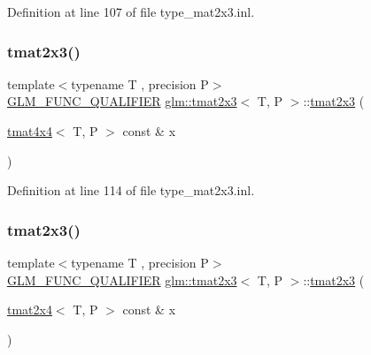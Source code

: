 Definition at line 107 of file type\+\_\+mat2x3.\+inl.

\mbox{\label{structglm_1_1tmat2x3_a8797fae4349161789ddaf71c932a1a49}} 
\subsubsection{\texorpdfstring{tmat2x3()}{tmat2x3()}\hspace{0.1cm}{\footnotesize\ttfamily [13/22]}}
{\footnotesize\ttfamily template$<$typename T , precision P$>$ \\
\mbox{\hyperlink{setup_8hpp_a33fdea6f91c5f834105f7415e2a64407}{G\+L\+M\+\_\+\+F\+U\+N\+C\+\_\+\+Q\+U\+A\+L\+I\+F\+I\+ER}} \mbox{\hyperlink{structglm_1_1tmat2x3}{glm\+::tmat2x3}}$<$ T, P $>$\+::\mbox{\hyperlink{structglm_1_1tmat2x3}{tmat2x3}} (\begin{DoxyParamCaption}\item[{\mbox{\hyperlink{structglm_1_1tmat4x4}{tmat4x4}}$<$ T, P $>$ const \&}]{x }\end{DoxyParamCaption})}



Definition at line 114 of file type\+\_\+mat2x3.\+inl.

\mbox{\label{structglm_1_1tmat2x3_a23808a1c5d5674c6ebb0486c2ae2fe81}} 
\subsubsection{\texorpdfstring{tmat2x3()}{tmat2x3()}\hspace{0.1cm}{\footnotesize\ttfamily [14/22]}}
{\footnotesize\ttfamily template$<$typename T , precision P$>$ \\
\mbox{\hyperlink{setup_8hpp_a33fdea6f91c5f834105f7415e2a64407}{G\+L\+M\+\_\+\+F\+U\+N\+C\+\_\+\+Q\+U\+A\+L\+I\+F\+I\+ER}} \mbox{\hyperlink{structglm_1_1tmat2x3}{glm\+::tmat2x3}}$<$ T, P $>$\+::\mbox{\hyperlink{structglm_1_1tmat2x3}{tmat2x3}} (\begin{DoxyParamCaption}\item[{\mbox{\hyperlink{structglm_1_1tmat2x4}{tmat2x4}}$<$ T, P $>$ const \&}]{x }\end{DoxyParamCaption})}



